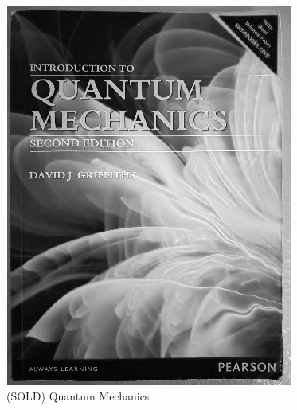 \documentclass[t]{beamer}
\newcommand{\htarget}[2]{\hypertarget{#1}{#2}}
\begin{document}
\begin{frame}\htarget{QM}{} \begin{center}
\includegraphics[height=0.8\textheight]{Quantum_Mechanics_sold.jpg} \\
(SOLD) Quantum Mechanics
\end{center} \end{frame}
\end{document}
